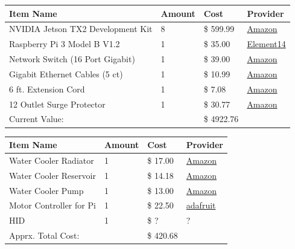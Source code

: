 \documentclass{article}
\begin{document}
\begin{center}
    \center
    \begin{tabular}{ | l | l | l | l |}
    \hline
    Item Name & Amount & Cost & Provider \\ \hline
	NVIDIA Jetson TX2 Development Kit & 8 & \$ 599.99 & \href{https://www.amazon.com/dp/B06XPFH939/ref=cm_sw_r_cp_dp_T1_2y1FzbPSCWS3Q}{Amazon}\\ \hline
	Raspberry Pi 3 Model B V1.2 & 1 & \$ 35.00 & \href{www.newark.com/raspberry-pi/rpi2-modb-v1-2/sbc-raspberry-pi-2-model-b-v1/dp/95Y1948?COM=superwidget-link_RaspberryPi}{Element14}\\ \hline
    Network Switch (16 Port Gigabit) & 1 & \$ 39.00 & \href{http://a.co/9ZxWnFD}{Amazon} \\ \hline
    Gigabit Ethernet Cables (5 ct) & 1 & \$ 10.99 & \href{https://www.amazon.com/dp/B01INRUFGK/ref=cm_sw_r_cp_dp_T1_RxhGzbGBQHJKQ}{Amazon} \\ \hline
    6 ft. Extension Cord & 1 & \$ 7.08 & \href{http://a.co/dOocaaY}{Amazon} \\ \hline
    12 Outlet Surge Protector & 1 & \$ 30.77 & \href{http://a.co/dXDFZkl}{Amazon} \\ \hline
    Current Value: & & \$ 4922.76 & \\ \hline
    \end{tabular}
\begin{tabular}{ | l | l | l | l |}
    \hline
    Item Name & Amount & Cost & Provider \\ \hline
    Water Cooler Radiator & 1 & \$ 17.00 & \href{http://a.co/1dHksiW}{Amazon} \\ \hline
    Water Cooler Reservoir & 1 & \$ 14.18 & \href{http://a.co/0tiCxUf}{Amazon} \\ \hline
    Water Cooler Pump & 1  & \$ 13.00 & \href{http://a.co/dSwtybB}{Amazon} \\ \hline
    Motor Controller for Pi & 1 & \$ 22.50 & \href{https://www.adafruit.com/product/2348}{adafruit}\\ \hline
    HID & 1 & \$ ? & ? \\ \hline
    Apprx. Total Cost: & & \$ 420.68 & \\
    \hline
    \end{tabular}
\end{center}
\end{document}
